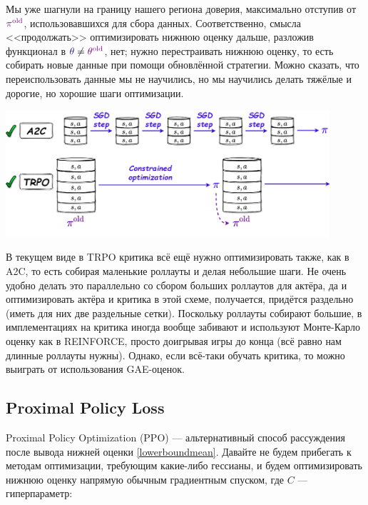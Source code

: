 Мы уже шагнули на границу нашего региона доверия, максимально отступив от $\textcolor{ChadPurple}{\pi^{\old}}$, использовавшихся для сбора данных. Соответственно, смысла <<продолжать>> оптимизировать нижнюю оценку дальше, разложив функционал в $\textcolor{ChadBlue}{\theta} \ne \textcolor{ChadPurple}{\theta^{\old}}$, нет; нужно перестраивать нижнюю оценку, то есть собирать новые данные при помощи обновлённой стратегии. Можно сказать, что переиспользовать данные мы не научились, но мы научились делать тяжёлые и дорогие, но хорошие шаги оптимизации. 

\vspace{0.4cm}
\begin{center}
\includegraphics[width=0.9\textwidth]{Images/TRPOpipeline2.png}
\end{center}

\begin{remark}
В текущем виде в TRPO критика всё ещё нужно оптимизировать также, как в A2C, то есть собирая маленькие роллауты и делая небольшие шаги. Не очень удобно делать это параллельно со сбором больших роллаутов для актёра, да и оптимизировать актёра и критика в этой схеме, получается, придётся раздельно (иметь для них две раздельные сетки). Поскольку роллауты собирают большие, в имплементациях на критика иногда вообще забивают и используют Монте-Карло оценку как в REINFORCE, просто доигрывая игры до конца (всё равно нам длинные роллауты нужны). Однако, если всё-таки обучать критика, то можно выиграть от использования GAE-оценок.
\end{remark}

\subsection{Proximal Policy Loss}

Proximal Policy Optimization (PPO) --- альтернативный способ рассуждения после вывода нижней оценки \eqref{lowerboundmean}. Давайте не будем прибегать к методам оптимизации, требующим какие-либо гессианы, и будем оптимизировать нижнюю оценку напрямую обычным градиентным спуском, где $C$ --- гиперпараметр:

